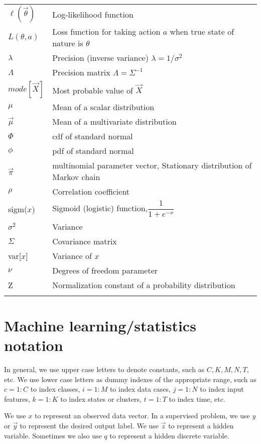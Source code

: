 \begin{longtable}{p{2.4cm}p{8.9cm}}
$\ell(\vec{\theta})$ & Log-likelihood function\\
$L(\theta,a)$ & Loss function for taking action $a$ when true state of nature is $\theta$\\
$\lambda$ & Precision (inverse variance) $\lambda=1/\sigma^2$\\
$\Lambda$ & Precision matrix $\Lambda=\Sigma^{-1}$\\
$mode[\vec X]$ & Most probable value of $\vec X$\\
$\mu$ & Mean of a scalar distribution\\
$\vec{\mu}$ & Mean of a multivariate distribution\\
$\Phi$ & cdf of standard normal\\
$\phi$ & pdf of standard normal\\
$\vec{\pi}$ & multinomial parameter vector, Stationary distribution of Markov chain\\
$\rho$ & Correlation coefficient \\
sigm($x$) & Sigmoid (logistic) function,$\dfrac{1}{1+e^{-x}}$\\
$\sigma^2$ & Variance\\
$\Sigma$ & Covariance matrix\\
var[$x$] & Variance of $x$\\
$\nu$ & Degrees of freedom parameter\\
Z & Normalization constant of a probability distribution\\
\noalign{\smallskip}\hline\noalign{\smallskip}
\end{longtable}

\section*{Machine learning/statistics notation}
In general, we use upper case letters to denote constants, such as $C, K, M, N, T$, etc. We use lower case letters as dummy indexes of the appropriate range, such as $c=1:C$ to index classes, $i=1:M$ to index data cases, $j=1:N$ to index input features, $k=1:K$ to index states or clusters, $t=1:T$ to index time, etc.

We use $x$ to represent an observed data vector. In a supervised problem, we use $y$ or $\vec{y}$ to represent the desired output label. We use $\vec{z}$ to represent a hidden variable. Sometimes we also use $q$ to represent a hidden discrete variable.

